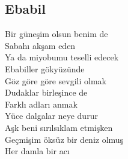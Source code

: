 \subsection{Ebabil}

Bir güneşim olsun benim de \\
Sabahı akşam eden \\
Ya da miyobumu teselli edecek \\
Ebabiller gökyüzünde \\

\noindent\newline
Göz göre göre sevgili olmak \\
Dudaklar birleşince de \\
Farklı adları anmak \\

\noindent\newline
Yüce dalgalar neye durur \\
Aşk beni sırılsıklam etmişken \\
Geçmişim öksüz bir deniz olmuş \\
Her damla bir acı \\